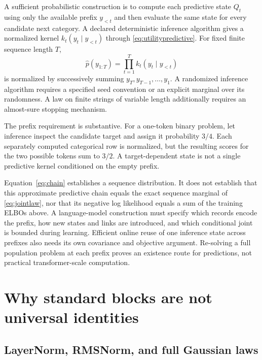 \documentclass[11pt]{article}
\begin{document}
A sufficient probabilistic construction is to compute each predictive state $Q_t$ using only the available prefix $y_{<t}$ and then evaluate the same state for every candidate next category. A declared deterministic inference algorithm gives a normalized kernel $k_t(y_t\mid y_{<t})$ through \eqref{eq:utilitypredictive}. For fixed finite sequence length $T$,
\begin{equation}
\widehat p(y_{1:T})=\prod_{t=1}^{T}k_t(y_t\mid y_{<t})
\label{eq:chain}
\end{equation}
is normalized by successively summing $y_T,y_{T-1},\ldots,y_1$. A randomized inference algorithm requires a specified seed convention or an explicit marginal over its randomness. A law on finite strings of variable length additionally requires an almost-sure stopping mechanism.

The prefix requirement is substantive. For a one-token binary problem, let inference inspect the candidate target and assign it probability $3/4$. Each separately computed categorical row is normalized, but the resulting scores for the two possible tokens sum to $3/2$. A target-dependent state is not a single predictive kernel conditioned on the empty prefix.

Equation~\eqref{eq:chain} establishes a sequence distribution. It does not establish that this approximate predictive chain equals the exact sequence marginal of \eqref{eq:jointlaw}, nor that its negative log likelihood equals a sum of the training ELBOs above. A language-model construction must specify which records encode the prefix, how new states and links are introduced, and which conditional joint is bounded during learning. Efficient online reuse of one inference state across prefixes also needs its own covariance and objective argument. Re-solving a full population problem at each prefix proves an existence route for predictions, not practical transformer-scale computation.

\section{Why standard blocks are not universal identities}
\label{sec:obstructions}

\subsection{LayerNorm, RMSNorm, and full Gaussian laws}
\end{document}
